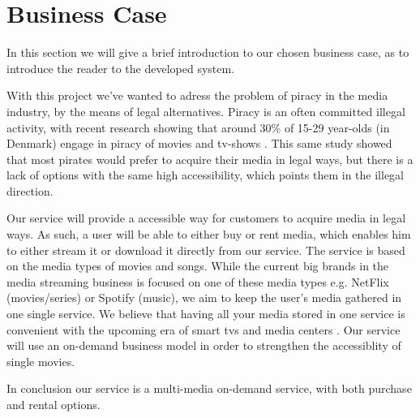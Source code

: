 \section{Business Case}
In this section we will give a brief introduction to our chosen business case, as to introduce the reader to the developed system.

With this project we've wanted to adress the problem of piracy in the media industry, by the means of legal alternatives. Piracy is an often committed illegal activity, with recent research showing that around 30\% of 15-29 year-olds (in Denmark) engage in piracy of movies and tv-shows \cite{pirates}.
This same study showed that most pirates would prefer to acquire their media in legal ways, but there is a lack of options with the same high accessibility, which points them in the illegal direction.

Our service will provide a accessible way for customers to acquire media in legal ways. As such, a user will be able to either buy or rent media, which enables him to either stream it or download it directly from our service. The service is based on the media types of movies and songs.  While the current big brands in the media streaming business is focused on one of these media types e.g. NetFlix (movies/series) or Spotify (music), we aim to keep the user's media gathered in one single service. We believe that having all your media stored in one service is convenient with the upcoming era of smart tvs and media centers \cite{smarttv}. Our service will use an on-demand business model in order to strengthen the accessiblity of single movies.

In conclusion our service is a multi-media on-demand service, with both purchase and rental options.



